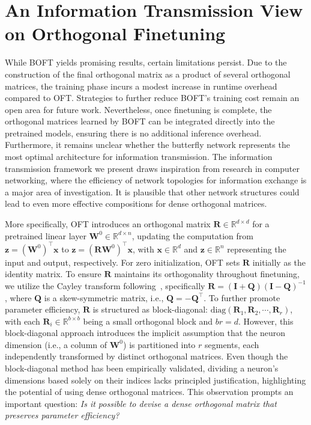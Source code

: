 \section{An Information Transmission View on Orthogonal Finetuning}

While BOFT yields promising results, certain limitations persist. Due to the construction of the final orthogonal matrix as a product of several orthogonal matrices, the training phase incurs a modest increase in runtime overhead compared to OFT. Strategies to further reduce BOFT’s training cost remain an open area for future work. Nevertheless, once finetuning is complete, the orthogonal matrices learned by BOFT can be integrated directly into the pretrained models, ensuring there is no additional inference overhead. Furthermore, it remains unclear whether the butterfly network represents the most optimal architecture for information transmission. The information transmission framework we present draws inspiration from research in computer networking, where the efficiency of network topologies for information exchange is a major area of investigation. It is plausible that other network structures could lead to even more effective compositions for dense orthogonal matrices.

More specifically, OFT introduces an orthogonal matrix $\bm{R}\in\mathbb{R}^{d\times d}$ for a pretrained linear layer $\bm{W}^0\in\mathbb{R}^{d\times n}$, updating the computation from $\bm{z}=(\bm{W}^0)^\top\bm{x}$ to $\bm{z}=(\bm{R}\bm{W}^0)^\top\bm{x}$, with $\bm{x}\in\mathbb{R}^{d}$ and $\bm{z}\in\mathbb{R}^{n}$ representing the input and output, respectively. For zero initialization, OFT sets $\bm{R}$ initially as the identity matrix. To ensure $\bm{R}$ maintains its orthogonality throughout finetuning, we utilize the Cayley transform following~\cite{qiu2023controlling,liu2021orthogonal}, specifically $\bm{R}=(\bm{I}+\bm{Q})(\bm{I}-\bm{Q})^{-1}$, where $\bm{Q}$ is a skew-symmetric matrix, i.e., $\bm{Q}=-\bm{Q}^\top$. To further promote parameter efficiency, $\bm{R}$ is structured as block-diagonal: $\text{diag}(\bm{R}_1,\bm{R}_2,\cdots,\bm{R}_r)$, with each $\bm{R}_i\in\mathbb{R}^{b\times b}$ being a small orthogonal block and $br=d$. However, this block-diagonal approach introduces the implicit assumption that the neuron dimension (i.e., a column of $\bm{W}^0$) is partitioned into $r$ segments, each independently transformed by distinct orthogonal matrices. Even though the block-diagonal method has been empirically validated, dividing a neuron’s dimensions based solely on their indices lacks principled justification, highlighting the potential of using dense orthogonal matrices. This observation prompts an important question: \emph{Is it possible to devise a dense orthogonal matrix that preserves parameter efficiency?}


